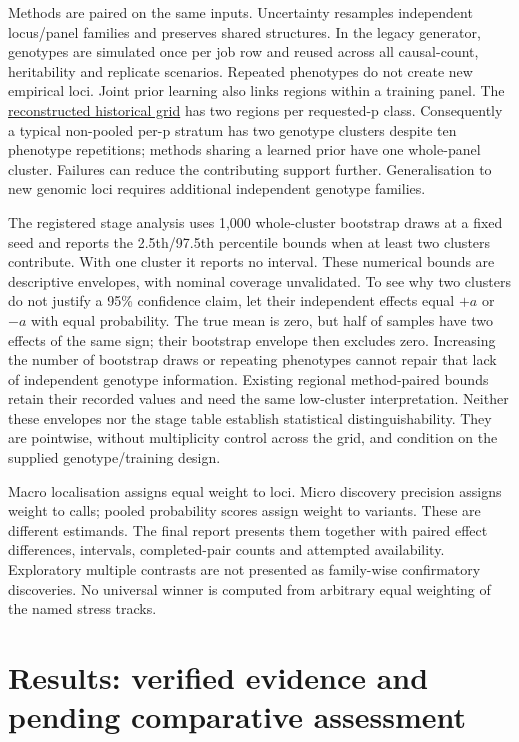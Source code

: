 \documentclass[
  british,
  10pt,
]{article}
\begin{document}
Methods are paired on the same inputs. Uncertainty resamples independent
locus/panel families and preserves shared structures. In the legacy
generator, genotypes are simulated once per job row and reused across
all causal-count, heritability and replicate scenarios. Repeated
phenotypes do not create new empirical loci. Joint prior learning also
links regions within a training panel. The
\href{../scripts/hpc/generate_params_grid.R}{reconstructed historical
grid} has two regions per requested-p class. Consequently a typical
non-pooled per-p stratum has two genotype clusters despite ten phenotype
repetitions; methods sharing a learned prior have one whole-panel
cluster. Failures can reduce the contributing support further.
Generalisation to new genomic loci requires additional independent
genotype families.

The registered stage analysis uses 1,000 whole-cluster bootstrap draws
at a fixed seed and reports the 2.5th/97.5th percentile bounds when at
least two clusters contribute. With one cluster it reports no interval.
These numerical bounds are descriptive envelopes, with nominal coverage
unvalidated. To see why two clusters do not justify a 95\% confidence
claim, let their independent effects equal \(+a\) or \(-a\) with equal
probability. The true mean is zero, but half of samples have two effects
of the same sign; their bootstrap envelope then excludes zero.
Increasing the number of bootstrap draws or repeating phenotypes cannot
repair that lack of independent genotype information. Existing regional
method-paired bounds retain their recorded values and need the same
low-cluster interpretation. Neither these envelopes nor the stage table
establish statistical distinguishability. They are pointwise, without
multiplicity control across the grid, and condition on the supplied
genotype/training design.

Macro localisation assigns equal weight to loci. Micro discovery
precision assigns weight to calls; pooled probability scores assign
weight to variants. These are different estimands. The final report
presents them together with paired effect differences, intervals,
completed-pair counts and attempted availability. Exploratory multiple
contrasts are not presented as family-wise confirmatory discoveries. No
universal winner is computed from arbitrary equal weighting of the named
stress tracks.

\section{Results: verified evidence and pending comparative
assessment}\label{results-verified-evidence-and-pending-comparative-assessment}
\end{document}
